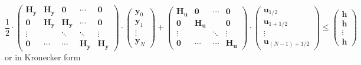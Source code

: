 \documentclass{article}
\newcommand{\vectorfont}[1]{\boldsymbol{#1}}%
\newcommand{\matrixfont}[1]{\mathbf{#1}}%
\newcommand{\hvec}{\vectorfont{h}}
\newcommand{\uvec}{\vectorfont{u}}
\newcommand{\yvec}{\vectorfont{y}}
\newcommand{\Hmat}{\matrixfont{H}}
\newcommand{\Nullmat}{\matrixfont{0}}
\begin{document}
\[
\frac{1}{2} \cdot
\begin{pmatrix}
	\Hmat_{\yvec} & \Hmat_{\yvec} & \Nullmat      & \cdots        & \Nullmat\\
	\Nullmat      & \Hmat_{\yvec} & \Hmat_{\yvec} & \cdots        & \Nullmat\\
	\vdots        &               & \ddots        & \ddots        & \vdots \\
	\Nullmat      & \cdots        & \cdots        & \Hmat_{\yvec} & \Hmat_{\yvec}
\end{pmatrix}
\cdot 
\begin{pmatrix} 	\yvec_0 \\ \yvec_1 \\ \vdots \\ \yvec_N \end{pmatrix}
+
\begin{pmatrix}
	\Hmat_{\uvec} & \Nullmat      & \cdots & \Nullmat \\
	\Nullmat      & \Hmat_{\uvec} &        & \Nullmat \\
	\vdots        &               & \ddots & \vdots   \\
	\Nullmat      & \cdots        & \cdots & \Hmat_{\uvec}
\end{pmatrix}
\cdot 
\begin{pmatrix}
	\uvec_{1/2} \\ \uvec_{1+1/2} \\ \vdots \\ \uvec_{(N-1)+1/2}
\end{pmatrix}
\leq
\begin{pmatrix} \hvec \\\hvec \\ \vdots \\\hvec \end{pmatrix}
\]
or in Kronecker form
\end{document}
